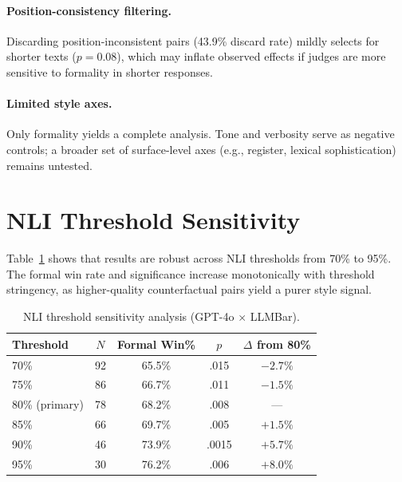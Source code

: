 \documentclass[11pt,a4paper]{article}
\begin{document}
\paragraph{Position-consistency filtering.}
Discarding position-inconsistent pairs (43.9\% discard rate) mildly selects for shorter texts ($p=0.08$), which may inflate observed effects if judges are more sensitive to formality in shorter responses.

\paragraph{Limited style axes.}
Only formality yields a complete analysis.
Tone and verbosity serve as negative controls; a broader set of surface-level axes (e.g., register, lexical sophistication) remains untested.

\appendix
\section{NLI Threshold Sensitivity}
\label{sec:nli_sensitivity}

Table~\ref{tab:nli_sensitivity} shows that results are robust across NLI thresholds from 70\% to 95\%.
The formal win rate and significance increase monotonically with threshold stringency, as higher-quality counterfactual pairs yield a purer style signal.

\begin{table}[h]
\centering
\small
\caption{NLI threshold sensitivity analysis (GPT-4o $\times$ LLMBar).}
\label{tab:nli_sensitivity}
\begin{tabular}{lcccc}
\toprule
\textbf{Threshold} & \textbf{$N$} & \textbf{Formal Win\%} & \textbf{$p$} & \textbf{$\Delta$ from 80\%} \\
\midrule
70\% & 92 & 65.5\% & .015 & $-2.7\%$ \\
75\% & 86 & 66.7\% & .011 & $-1.5\%$ \\
80\% (primary) & 78 & 68.2\% & .008 & --- \\
85\% & 66 & 69.7\% & .005 & $+1.5\%$ \\
90\% & 46 & 73.9\% & .0015 & $+5.7\%$ \\
95\% & 30 & 76.2\% & .006 & $+8.0\%$ \\
\bottomrule
\end{tabular}
\end{table}
\end{document}
